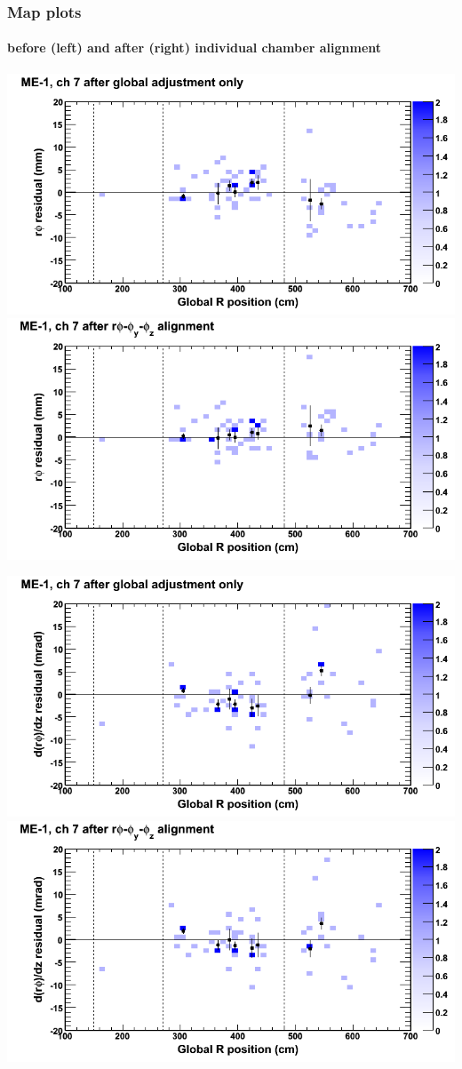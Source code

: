 \documentclass[compress]{beamer}
\begin{document}
\begin{frame}
\frametitle{Map plots}
\framesubtitle{before (left) and after (right) individual chamber alignment}
\includegraphics[width=0.5\linewidth]{ringmapplots_3dof/before_CSCvsr_mem1ch07_x.png} \includegraphics[width=0.5\linewidth]{ringmapplots_3dof/after_CSCvsr_mem1ch07_x.png}

\includegraphics[width=0.5\linewidth]{ringmapplots_3dof/before_CSCvsr_mem1ch07_dxdz.png} \includegraphics[width=0.5\linewidth]{ringmapplots_3dof/after_CSCvsr_mem1ch07_dxdz.png}
\end{frame}
\end{document}
